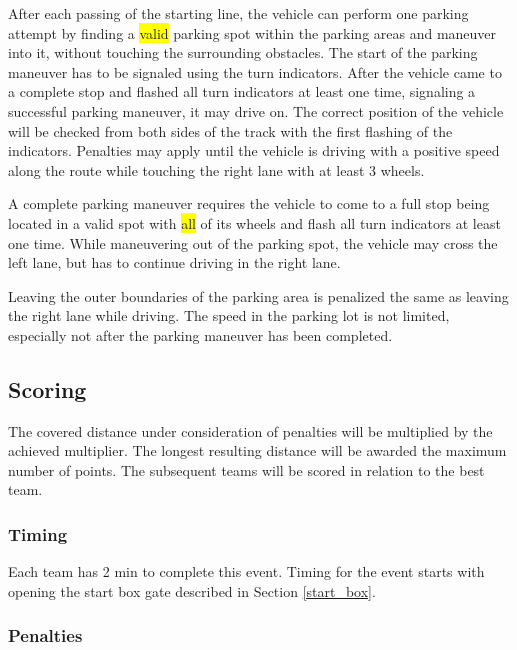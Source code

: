 After each passing of the starting line, the vehicle can perform one parking
attempt by finding a \colorbox{yellow}{valid} parking spot within the parking areas and maneuver into
it, without touching the surrounding obstacles. The start of the parking
maneuver has to be signaled using the turn indicators. After the vehicle came
to a complete stop and flashed all turn indicators at least one time, signaling
a successful parking maneuver, it may drive on. The correct position of the
vehicle will be checked from both sides of the track with the first flashing of
the indicators. Penalties may apply until the vehicle is driving with a
positive speed along the route while touching the right lane with at least 3
wheels.

A complete parking maneuver requires the vehicle to come to a full stop being
located in a valid spot with \colorbox{yellow}{all} of its wheels and flash all turn
indicators at least one time. While maneuvering out of the parking spot, the
vehicle may cross the left lane, but has to continue driving in the right lane.

Leaving the outer boundaries of the parking area is penalized the same as
leaving the right lane while driving. The speed in the parking lot is not
limited, especially not after the parking maneuver has been completed.

\subsection{Scoring}
\label{freedrive_scoring}

The covered distance under consideration of penalties will be multiplied by the
achieved multiplier. The longest resulting distance will be awarded the maximum
number of points. The subsequent teams will be scored in relation to the best
team.

\subsubsection{Timing}

Each team has 2 min to complete this event. Timing for the event starts with
opening the start box gate described in Section \ref{start_box}.

\subsubsection{Penalties}
\label{freedrive_penalties}

